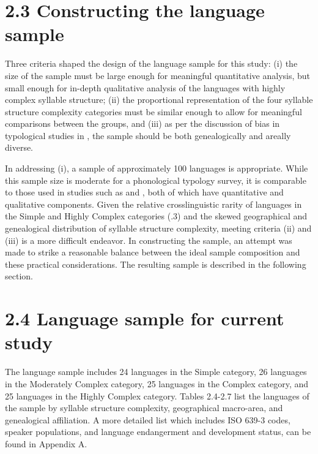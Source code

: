 \section{2.3 Constructing the language sample}

  Three criteria shaped the design of the language sample for this study: (i) the size of the sample must be large enough for meaningful quantitative analysis, but small enough for in-depth qualitative analysis of the languages with highly complex syllable structure; (ii) the proportional representation of the four syllable structure complexity categories must be similar enough to allow for meaningful comparisons between the groups, and (iii) as per the discussion of bias in typological studies in , the sample should be both genealogically and areally diverse.

  In addressing (i), a sample of approximately 100 languages is appropriate. While this sample size is moderate for a phonological typology survey, it is comparable to those used in studies such as \citet{Bateman2007} and \citet{BybeeEasterday2019}, both of which have quantitative and qualitative components. Given the relative crosslinguistic rarity of languages in the Simple and Highly Complex categories (.3) and the skewed geographical and genealogical distribution of syllable structure complexity, meeting criteria (ii) and (iii) is a more difficult endeavor. In constructing the sample, an attempt was made to strike a reasonable balance between the ideal sample composition and these practical considerations. The resulting sample is described in the following section.

\section{\rmfamily} 
\section{2.4 Language sample for current study}

  The language sample includes 24 languages in the Simple category, 26 languages in the Moderately Complex category, 25 languages in the Complex category, and 25 languages in the Highly Complex category. Tables 2.4-2.7 list the languages of the sample by syllable structure complexity, geographical macro-area, and genealogical affiliation. A more detailed list which includes ISO 639-3 codes, speaker populations, and language endangerment and development status, can be found in Appendix A.

